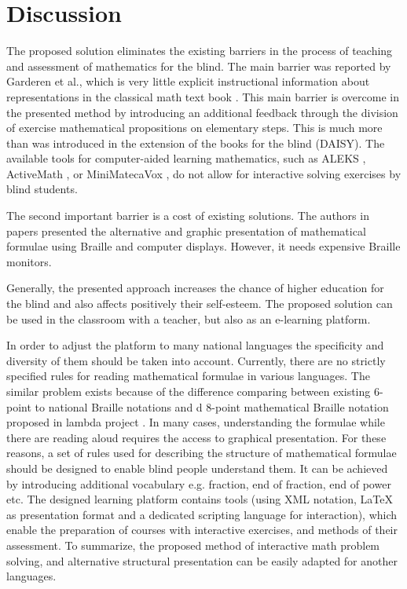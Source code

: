 \documentclass[12pt,1p]{elsarticle}
\begin{document}
\section{Discussion}
	The proposed solution eliminates the existing barriers in the process of teaching and assessment of mathematics for the blind. The main barrier was reported by Garderen et al., which is very little explicit instructional information about representations in the classical math text book \cite{Garderen:2012}. This main barrier is overcome in the presented method by introducing an additional feedback through the division of exercise mathematical propositions on elementary steps. This is much more than was introduced in the extension of the books for the blind (DAISY). The available tools for computer-aided learning mathematics, such as ALEKS \cite{Craiga:2013}, ActiveMath \cite{Goguadze:2005}, or MiniMatecaVox \cite{Henderson:2014}, do not allow for interactive solving exercises by blind students.
	
	The second important barrier is a cost of existing solutions. The authors in papers \cite{Brzoza:2012, Brzoza:2014} presented the alternative and graphic presentation of mathematical formulae using Braille and computer displays. However, it needs expensive Braille monitors.
	
	Generally, the presented approach increases the chance of higher education for the blind and also affects positively their self-esteem. The proposed solution can be used in the classroom with a teacher, but also as an e-learning platform.
	
	In order to adjust the platform to many national languages the specificity and diversity of them should be taken into account. Currently, there are no strictly specified rules for reading mathematical formulae in various languages. The similar problem exists because of the difference comparing between existing 6-point to national Braille notations and d 8-point mathematical Braille notation proposed in lambda project \cite{Brzoza:2012, Brzoza:2014}. In many cases, understanding the formulae while there are reading aloud requires the access to graphical presentation. For these reasons, a set of rules used for describing the structure of mathematical formulae should be designed to enable blind people understand them. It can be achieved by introducing additional vocabulary e.g. fraction, end of fraction, end of power etc. The designed learning platform contains tools (using XML notation, LaTeX as presentation format and a dedicated scripting language for interaction), which enable the preparation of courses with interactive exercises, and methods of their assessment. To summarize, the proposed method of interactive math problem solving, and alternative structural presentation can be easily adapted for another languages.
	
\end{document}
